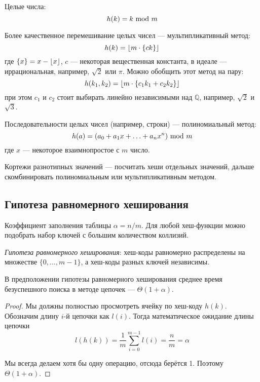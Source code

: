 Целые числа:
\[ h(k) = k ~\text{mod}~ m \]

Более качественное перемешивание целых чисел
--- мультипликативный метод:
\[ h(k) = \left \lfloor m \cdot \{ck\} \right \rfloor \]
где $\{x\} = x - \left \lfloor x \right \rfloor$, $c$ --- некоторая вещественная константа,
в идеале --- иррациональная, например, $\sqrt{2}$ или $\pi$.
Можно обобщить этот метод на пару:
\[ h(k_1, k_2) = \left \lfloor m \cdot \{c_1 k_1 + c_2 k_2\} \right \rfloor \]
при этом $c_1$ и $c_2$ стоит выбирать линейно независимыми
над $\mathds{Q}$, например, $\sqrt{2}$ и $\sqrt{3}$.

Последовательности целых чисел (например, строки)
--- полиномиальный метод:
\[ h(a) = (a_0 + a_1 x + \ldots + a_n x^n) ~\text{mod}~ m \]
где $x$ --- некоторое взаимнопростое с $m$ число.

Кортежи разнотипных значений --- посчитать хеши
отдельных значений, дальше скомбинировать
полиномиальным или мультипликативным методом.

\subsection{Гипотеза равномерного хеширования}
Коэффициент заполнения таблицы $\alpha = n/m$.
Для любой хеш-функции можно подобрать набор ключей
с большим количеством коллизий.

\emph{Гипотеза равномерного хеширования}:
хеш-коды равномерно распределены на
множестве $\{0, \ldots, m - 1\}$,
а хеш-коды разных ключей независимы.

\begin{theorem}
    В предположении гипотезы равномерного хеширования
    среднее время безуспешного поиска в методе цепочек
    --- $\Theta(1 + \alpha)$.
\end{theorem}
\begin{proof}
    Мы должны полностью просмотреть ячейку по хеш-коду $h(k)$.
    Обозначим длину $i$-й цепочки как $l(i)$.
    Тогда математическое ожидание длины цепочки
    \[ l(h(k)) = \frac{1}{m} \sum_{i=0}^{m-1} l(i) = \frac{n}{m} = \alpha \]

    Мы всегда делаем хотя бы одну операцию, отсюда берётся 1.
    Поэтому $\Theta(1 + \alpha)$.
\end{proof}


